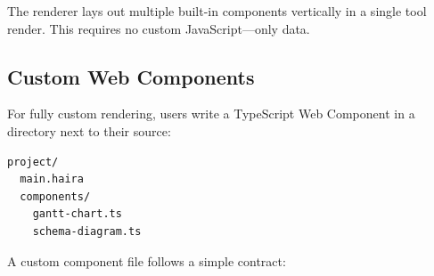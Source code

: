 The  renderer lays out multiple built-in components vertically in a single tool render. This requires no custom JavaScript---only data.

\subsection{Custom Web Components}

For fully custom rendering, users write a TypeScript Web Component in a  directory next to their \haira{} source:

\begin{lstlisting}[language={}]
project/
  main.haira
  components/
    gantt-chart.ts
    schema-diagram.ts
\end{lstlisting}

A custom component file follows a simple contract:

